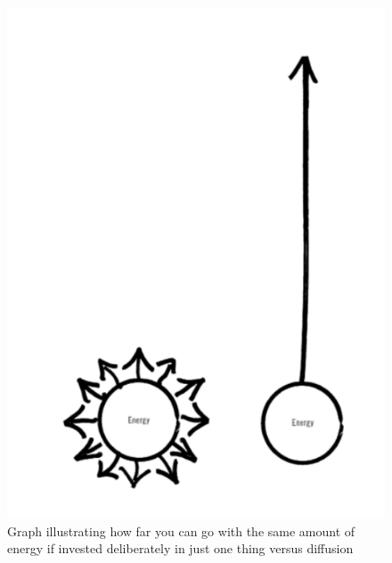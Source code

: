 \documentclass[11pt,a4paper]{article}
\begin{document}
\begin{paracol}{2}
\vspace{3em}

\begin{figure}[h]
    \centering
    \includegraphics{essentialism-energy.png}
    \caption{Graph illustrating how far you can go with the same amount of energy if invested deliberately in just one thing versus diffusion}
    \label{fig:my_label}
\end{figure}


\normalsize
\switchcolumn

\vspace{1em}




\end{paracol}
\end{document}
